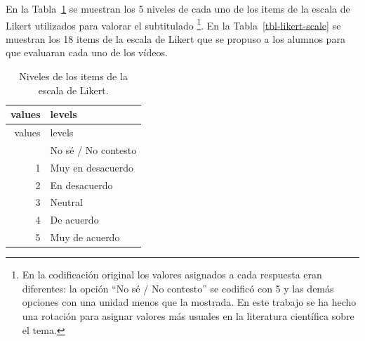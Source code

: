 \documentclass[
  12pt,
  a4paper,
  extrafontsizes,
  onecolumn,
  openright,
  table]{memoir}
\begin{document}
En la Tabla~\ref{tbl-likert-levels} se muestran los 5 niveles de cada
uno de los items de la escala de Likert utilizados para valorar el
subtitulado \footnote{En la codificación original los valores asignados
  a cada respuesta eran diferentes: la opción \enquote{No sé / No
  contesto} se codificó con 5 y las demás opciones con una unidad menos
  que la mostrada. En este trabajo se ha hecho una rotación para asignar
  valores más usuales en la literatura científica sobre el tema.}. En la
Tabla~\ref{tbl-likert-scale} se muestran los 18 items de la escala de
Likert que se propuso a los alumnos para que evaluaran cada uno de los
vídeos.

\hypertarget{tbl-likert-levels}{}
\begin{longtable}[]{@{}rl@{}}
\caption{\label{tbl-likert-levels}Niveles de los items de la escala de
Likert.}\tabularnewline
\toprule\noalign{}
values & levels \\
\midrule\noalign{}
\endfirsthead
\toprule\noalign{}
values & levels \\
\midrule\noalign{}
\endhead
\bottomrule\noalign{}
\endlastfoot
0 & No sé / No contesto \\
1 & Muy en desacuerdo \\
2 & En desacuerdo \\
3 & Neutral \\
4 & De acuerdo \\
5 & Muy de acuerdo \\
\end{longtable}
\end{document}

